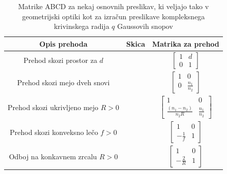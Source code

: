 \begin{table}[ht]
 \centering
  \begin{tabular}{|c|c|c|} \hline
  Opis prehoda & Skica & Matrika za prehod \\ \hline   
      Prehod skozi prostor za $d$ & \parbox[c]{3cm}{\def\svgwidth{25mm}} & 
      $\begin{bmatrix} 1 & d\\  0 & 1 \end{bmatrix}$ \\ \hline

      Prehod skozi mejo dveh snovi & \parbox[c]{3cm}{\def\svgwidth{25mm}} & 
      $\begin{bmatrix} 1 & 0\\ 0 & \frac{n_{1}}{n_{2}} \end{bmatrix}$ \\ \hline
      
      Prehod skozi ukrivljeno mejo $R>0$ & \parbox[c]{3cm}{\def\svgwidth{25mm}} & 
      $\begin{bmatrix} 1 & 0\\ \frac{(n_{1}-n_{2})}{n_{2}R} & \frac{n_{1}}{n_{2}} \end{bmatrix}$ \\ \hline
      
      Prehod skozi konveksno lečo $f>0$ & \parbox[c]{3cm}{\def\svgwidth{25mm}} & 
      $\begin{bmatrix} 1 & 0\\ -\frac{1}{f} & 1 \end{bmatrix}$ \\ \hline
      
      Odboj na konkavnem zrcalu $R>0$ & \parbox[c]{3cm}{\def\svgwidth{25mm}} & 
      $\begin{bmatrix} 1 & 0\\ -\frac{2}{R} & 1 \end{bmatrix}$ \\ \hline    
  \end{tabular}
  \caption{Matrike ABCD za nekaj osnovnih preslikav, ki veljajo tako v 
	  geometrijski optiki kot za izračun preslikave kompleksnega
	  krivinskega radija $q$ Gaussovih snopov}
\label{fig:Matrike-za-preslikave}
\end{table}
\newpage
